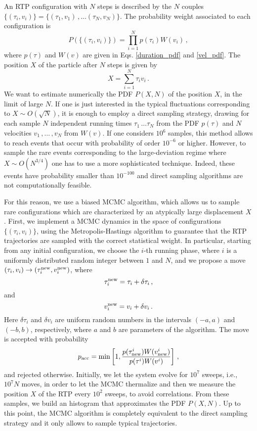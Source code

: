 \documentclass[aps,pre,twocolumn,superscriptaddress,showpacs]{revtex4-1}
\begin{document}
An RTP configuration with $N$ steps is described by the $N$ couples $\{(\tau_i,v_i)\}=\{(\tau_1,v_1)\,,\ldots(\tau_N,v_N)\}$. The probability weight associated to each configuration is
\begin{equation}
P(\{(\tau_i,v_i)\})=\prod_{i=1}^{N}p(\tau_i)W(v_i)\,,
\end{equation}
where $p(\tau)$ and $W(v)$ are given in Eqs. \eqref{duration_pdf} and \eqref{vel_pdf}.
The position $X$ of the particle after $N$ steps is given by
\begin{equation}
X=\sum_{i=1}^N \tau_i v_i\,.
\end{equation}
We want to estimate numerically the PDF $P(X,N)$ of the position $X$, in the limit of large $N$. If one is just interested in the typical fluctuations corresponding to $X\sim O(\sqrt{N})$, it is enough to employ a direct sampling strategy, drawing for each sample $N$ independent running times $\tau_1\,\ldots\tau_N$ from the PDF $p(\tau)$ and $N$ velocities $v_1\,,\ldots\,,v_N$ from $W(v)$. If one considers $10^{6}$ samples, this method allows to reach events that occur with probability of order $10^{-6}$ or higher. However, to sample the rare events corresponding to the large-deviation regime where $X\sim O(N^{3/4})$ one has to use a more sophisticated technique. Indeed, these events have probability smaller than $10^{-100}$ and direct sampling algorithms are not computationally feasible.


For this reason, we use a biased MCMC algorithm, which allows us to sample rare configurations which are characterized by an atypically large displacement $X$. First, we implement a MCMC dynamics in the space of configurations $\{(\tau_i,v_i)\}$, using the Metropolis-Hastings algorithm to guarantee that the RTP trajectories are sampled with the correct statistical weight. In particular, starting from any initial configuration, we choose the $i$-th running phase, where $i$ is a uniformly distributed random integer between $1$ and $N$, and we propose a move $(\tau_i,v_i)\to (\tau_i^{\rm new},v_i^{\rm new})$, where
\begin{equation}
\tau_i^{\rm new}=\tau_i+\delta\tau_i\,,
\end{equation}
and 
\begin{equation}
v_i^{\rm new}=v_i+\delta v_i\,.
\end{equation}
Here $\delta \tau_i$ and $\delta v_i$ are uniform random numbers in the intervals $(-a,a)$ and $(-b,b)$, respectively, where $a$ and $b$ are parameters of the algorithm. The move is accepted with probability
\begin{equation}
p_{\rm acc}=\min \left[ 1, \frac{p(\tau^i_{\rm new})W(v^i_{\rm new})}{p(\tau^i)W(v^i)}\right]\,,
\end{equation}
and rejected otherwise. Initially, we let the system evolve for $10^7$ sweeps, i.e., $10^7 N$ moves, in order to let the MCMC thermalize and then we measure the position $X$ of the RTP every $10^2$ sweeps, to avoid correlations. From these samples, we build an histogram that approximates the PDF $P(X,N)$. Up to this point, the MCMC algorithm is completely equivalent to the direct sampling strategy and it only allows to sample typical trajectories.
\end{document}

